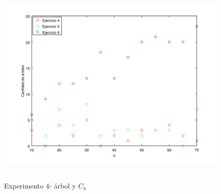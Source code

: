      \begin{figure}[H]
      \includegraphics[height=10cm]{graficos/ejercicio7-exp4-comb3.png}
       \caption{Experimento 4- árbol y $C_n$}
	\end{figure}
    
    
    
